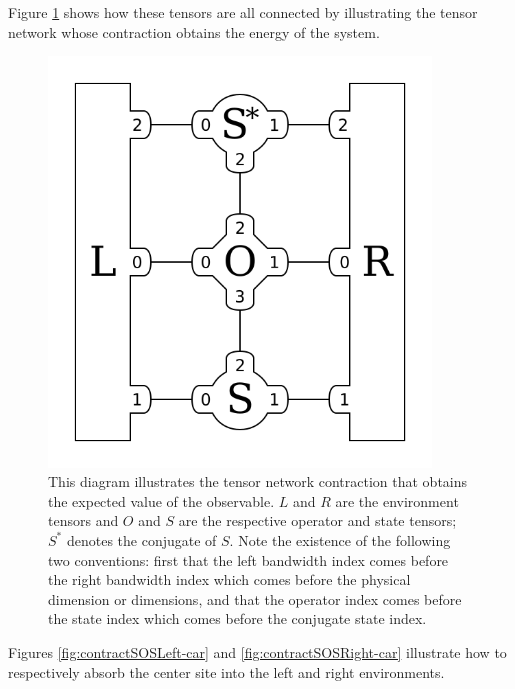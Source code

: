 \documentclass{article}
\newcommand{\diagramwidth}{4in}
\begin{document}
Figure \ref{fig:expectation-car} shows how these tensors are all connected by illustrating the tensor network whose contraction obtains the energy of the system.
\begin{figure}\begin{center}
\includegraphics[width=\diagramwidth]{drawings/expectation-car}
\caption{\label{fig:expectation-car} This diagram illustrates the tensor network contraction that obtains the expected value of the observable.  $L$ and $R$ are the environment tensors and $O$ and $S$ are the respective operator and state tensors; $S^*$ denotes the conjugate of $S$.  Note the existence of the following two conventions:  first that the left bandwidth index comes before the right bandwidth index which comes before the physical dimension or dimensions, and that the operator index comes before the state index which comes before the conjugate state index.}
\end{center}\end{figure}

Figures \ref{fig:contractSOSLeft-car} and \ref{fig:contractSOSRight-car} illustrate how to respectively absorb the center site into the left and right environments.
\end{document}
